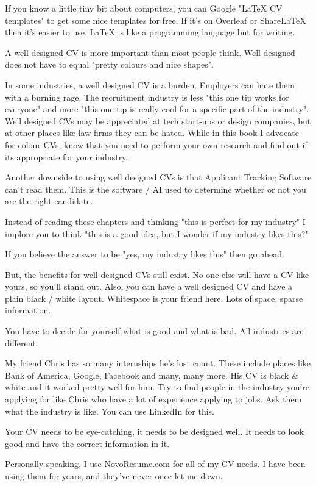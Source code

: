 \documentclass{article}
\begin{document}
If you know a little tiny bit about computers, you can Google "LaTeX CV
templates" to get some nice templates for free. If it's on Overleaf or
ShareLaTeX then it's easier to use. LaTeX is like a programming language
but for writing.

A well-designed CV is more important than most people think. Well
designed does not have to equal "pretty colours and nice shapes".

In some industries, a well designed CV is a burden. Employers can hate
them with a burning rage. The recruitment industry is less "this one
tip works for everyone" and more "this one tip is really cool for a
specific part of the industry". Well designed CVs may be appreciated at
tech start-ups or design companies, but at other places like law firms
they can be hated. While in this book I advocate for colour CVs, know
that you need to perform your own research and find out if its
appropriate for your industry.

Another downside to using well designed CVs is that Applicant Tracking
Software can't read them. This is the software / AI used to determine
whether or not you are the right candidate.

Instead of reading these chapters and thinking "this is perfect for my
industry" I implore you to think "this is a good idea, but I wonder if
my industry likes this?"

If you believe the answer to be "yes, my industry likes this" then go
ahead.

But, the benefits for well designed CVs still exist. No one else will
have a CV like yours, so you'll stand out. Also, you can have a well
designed CV and have a plain black / white layout. Whitespace is your
friend here. Lots of space, sparse information.

You have to decide for yourself what is good and what is bad. All
industries are different.

My friend Chris has so many internships he's lost count. These include
places like Bank of America, Google, Facebook and many, many more. His
CV is black \& white and it worked pretty well for him. Try to find
people in the industry you're applying for like Chris who have a lot of
experience applying to jobs. Ask them what the industry is like. You can
use LinkedIn for this.

Your CV needs to be eye-catching, it needs to be designed well. It needs
to look good and have the correct information in it.

Personally speaking, I use NovoResume.com for all of my CV needs. I have
been using them for years, and they've never once let me down.
\end{document}
